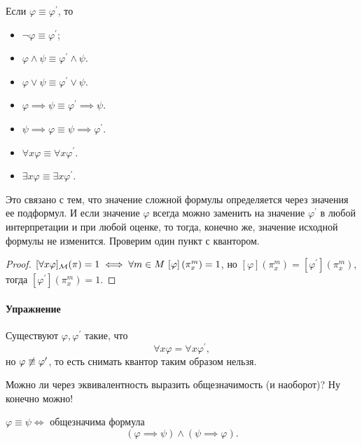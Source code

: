 \begin{lemma}
    Если $\varphi \equiv \varphi^{\prime}$, то
    \begin{itemize}
        \item $\neg \varphi \equiv \varphi^{\prime}$;
        \item $\varphi \land \psi \equiv \varphi^{\prime} \land \psi$.
        \item $\varphi \lor \psi \equiv \varphi^{\prime} \lor \psi$.
        \item $\varphi \implies \psi \equiv \varphi^{\prime} \implies \psi$.
        \item $\psi \implies \varphi \equiv \psi \implies \varphi^{\prime}$.
        \item $\forall x \varphi \equiv \forall x \varphi^{\prime}$.
        \item $\exists x \varphi \equiv \exists x \varphi^{\prime}$.
    \end{itemize}
\end{lemma}

Это связано с тем, что значение сложной формулы определяется через значения ее подформул.
И если значение $\varphi$ всегда можно заменить на значение $\varphi^{\prime}$ в любой интерпретации и при любой оценке, то тогда, конечно же, значение исходной формулы не изменится.
Проверим один пункт с квантором.

\begin{proof}
    $[\forall x \varphi]_{\mathcal{M}}(\pi) = 1 \iff \forall m \in M~[\varphi]\left( \pi_{x}^{m} \right) = 1$, но $[\varphi]\left( \pi_{x}^{m} \right) = [\varphi^{\prime}]\left( \pi_{x}^{m} \right)$, тогда $[\varphi^{\prime}]\left( \pi_{x}^{m} \right) = 1$.
\end{proof}

\paragraph{Упражнение}
Существуют $\varphi, \varphi^{\prime}$ такие, что
$$
    \forall x \varphi = \forall x \varphi^{\prime},
$$
но $\varphi \centernot\equiv \varphi^{\prime}$, то есть снимать квантор таким образом нельзя.

Можно ли через эквивалентность выразить общезначимость (и наоборот)?
Ну конечно можно!

\begin{lemma}
    $\varphi \equiv \psi \iff $ общезначима формула
    $$
        (\varphi \implies \psi) \land (\psi \implies \varphi).
    $$
\end{lemma}

